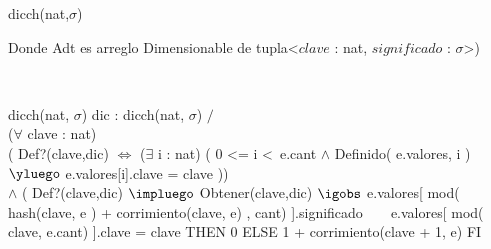 \begin{Representacion}

	
	\begin{Estructura}{dicch(nat,$\sigma$)}
		\begin{Tupla}
		\end{Tupla}
		Donde Adt es arreglo Dimensionable de tupla<$clave$ : nat, $significado$ : $\sigma$>)
	\end{Estructura}
	
	
~
	
	\AbsFc
	{dicch(nat, $\sigma$)}
	{dic : dicch(nat, $\sigma$) $/$ \\
		($\forall$ clave : nat) \\
		( Def?(clave,dic) $\Leftrightarrow$ ($\exists$ i : nat)
		( 0 <= i <\ e.cant $\land$ Definido( e.valores, i ) 
		$\yluego$ e.valores[i].clave = clave )) 
		\\	$\land$ ( Def?(clave,dic) $\impluego$ Obtener(clave,dic) $\igobs$ 
		e.valores[ mod( hash(clave, e ) + corrimiento(clave, e) , cant) ].significado}
~
~											
	{\IF e.valores[ mod( clave, e.cant) ].clave = clave
		THEN 0
		ELSE 1 + corrimiento(clave + 1, e)
	FI}		

\end{Representacion}

